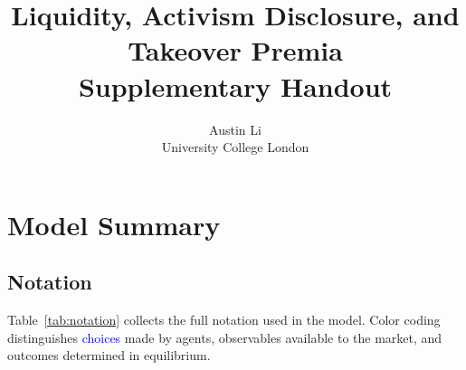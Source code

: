 \documentclass[11pt,a4paper]{article}
\title{\textbf{Liquidity, Activism Disclosure, and Takeover Premia}\\[0.3em]
\large Supplementary Handout}
\author{Austin Li\\University College London}
\date{}
\newcommand{\1}{\mathbf{1}}
\newcommand{\choice}[1]{\textcolor{blue}{#1}}
\newcommand{\obs}[1]{\textcolor{red!70!black}{#1}}
\newcommand{\outcome}[1]{\textcolor{green!50!black}{#1}}
\begin{document}
\maketitle

\section{Model Summary}

\subsection{Notation}

Table~\ref{tab:notation} collects the full notation used in the model.
Color coding distinguishes \choice{choices} made by agents,
\obs{observables} available to the market, and
\outcome{outcomes} determined in equilibrium.
\end{document}
